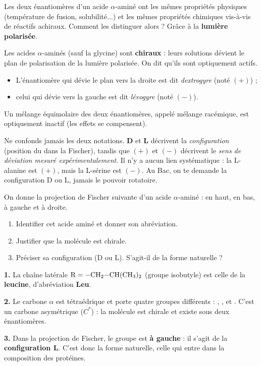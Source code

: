 \documentclass[11pt]{article}
\newcommand{\cle}[1]{{\popxbold\color{popdark}#1}}
\newcounter{popsec}
\newcounter{popsub}
\newcommand{\courssub}[1]{%
  \stepcounter{popsub}%
  \par\vspace{9pt}\noindent{\popxbold\fontsize{11.5}{13}\selectfont\color{popink}{\color{poporange}\thepopsec.\thepopsub}\hspace{6pt}#1}\par\nopagebreak\vspace{4pt}
}
\begin{document}
\courssub{Activité optique}

Les deux énantiomères d'un acide $\alpha$-aminé ont les mêmes propriétés physiques (température de fusion, solubilité...) et les mêmes propriétés chimiques vis-à-vis de réactifs achiraux. Comment les distinguer alors ? Grâce à la \textbf{lumière polarisée}.

\begin{propriete}
Les acides $\alpha$-aminés (sauf la glycine) sont \textbf{chiraux} : leurs solutions dévient le plan de polarisation de la lumière polarisée. On dit qu'ils sont \cle{optiquement actifs}.
\begin{itemize}
\item L'énantiomère qui dévie le plan vers la droite est dit \emph{dextrogyre} (noté $(+)$) ;
\item celui qui dévie vers la gauche est dit \emph{lévogyre} (noté $(-)$).
\end{itemize}
Un mélange équimolaire des deux énantiomères, appelé \cle{mélange racémique}, est optiquement inactif (les effets se compensent).
\end{propriete}

\begin{attention}
Ne confonds jamais les deux notations. \textbf{D} et \textbf{L} décrivent la \emph{configuration} (position du  dans la Fischer), tandis que $(+)$ et $(-)$ décrivent le \emph{sens de déviation mesuré expérimentalement}. Il n'y a aucun lien systématique : la L-alanine est $(+)$, mais la L-sérine est $(-)$. Au Bac, on te demande la configuration D ou L, jamais le pouvoir rotatoire.
\end{attention}

\begin{exoresolu}
On donne la projection de Fischer suivante d'un acide $\alpha$-aminé :  en haut,  en bas,  à gauche et  à droite.
\begin{enumerate}
\item Identifier cet acide aminé et donner son abréviation.
\item Justifier que la molécule est chirale.
\item Préciser sa configuration (D ou L). S'agit-il de la forme naturelle ?
\end{enumerate}
\tcblower
\textbf{1.} La chaîne latérale $\ce{R} = \ce{-CH2-CH(CH3)2}$ (groupe isobutyle) est celle de la \textbf{leucine}, d'abréviation \textbf{Leu}.
\par\smallskip
\textbf{2.} Le carbone $\alpha$ est tétraédrique et porte quatre groupes différents : , ,  et . C'est un carbone asymétrique ($C^*$) : la molécule est chirale et existe sous deux énantiomères.
\par\smallskip
\textbf{3.} Dans la projection de Fischer, le groupe  est \textbf{à gauche} : il s'agit de la \textbf{configuration L}. C'est donc la forme naturelle, celle qui entre dans la composition des protéines.
\end{exoresolu}
\end{document}
